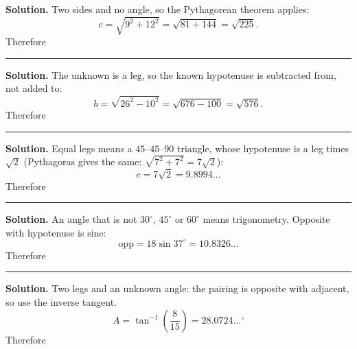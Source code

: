 \documentclass[12pt]{article}
\begin{document}




\noindent\textbf{Solution.} Two sides and no angle, so the Pythagorean theorem
applies:
\[ c = \sqrt{9^2 + 12^2} = \sqrt{81 + 144} = \sqrt{225} . \]
Therefore 

\vspace{0.15cm}\noindent\rule{\linewidth}{0.2pt}


\noindent\textbf{Solution.} The unknown is a leg, so the known hypotenuse is
subtracted from, not added to:
\[ b = \sqrt{26^2 - 10^2} = \sqrt{676 - 100} = \sqrt{576} . \]
Therefore 

\vspace{0.15cm}\noindent\rule{\linewidth}{0.2pt}


\noindent\textbf{Solution.} Equal legs means a $45$--$45$--$90$ triangle, whose
hypotenuse is a leg times $\sqrt{2}$ (Pythagoras gives the same:
$\sqrt{7^2+7^2} = 7\sqrt{2}$):
\[ c = 7\sqrt{2} = 9.8994\ldots \]
Therefore 

\vspace{0.15cm}\noindent\rule{\linewidth}{0.2pt}


\noindent\textbf{Solution.} An angle that is not $30^\circ$, $45^\circ$ or
$60^\circ$ means trigonometry. Opposite with hypotenuse is sine:
\[ \text{opp} = 18 \sin 37^\circ = 10.8326\ldots \]
Therefore 

\vspace{0.15cm}\noindent\rule{\linewidth}{0.2pt}


\noindent\textbf{Solution.} Two legs and an unknown angle: the pairing is
opposite with adjacent, so use the inverse tangent.
\[ A = \tan^{-1}\!\left(\frac{8}{15}\right) = 28.0724\ldots^\circ \]
Therefore 
\end{document}
